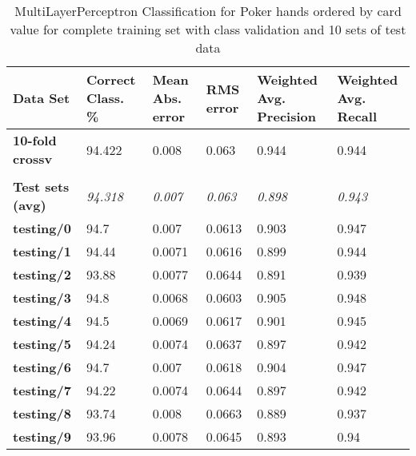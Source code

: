 \documentclass[10pt, a4paper]{article}
\begin{document}
\begin{table}[htbp]
  \centering
  \begin{tabular}{p{3cm}p{1.5cm}p{1.5cm}p{1.5cm}p{1.5cm}p{1.5cm}}
    \toprule
    \textbf{Data Set} & Correct Class. \% & Mean Abs. error & RMS error & Weighted Avg. Precision & Weighted Avg. Recall \\
    \midrule
    \textbf{10-fold crossv} & 94.422 & 0.008 & 0.063 & 0.944 & 0.944 \\
    \textbf{} &       &       &       &       &  \\
    \textbf{Test sets (avg)} & \textit{94.318} & \textit{0.007} & \textit{0.063} & \textit{0.898} & \textit{0.943} \\
    \textbf{   testing/0} & 94.7  & 0.007 & 0.0613 & 0.903 & 0.947 \\
    \textbf{   testing/1} & 94.44 & 0.0071 & 0.0616 & 0.899 & 0.944 \\
    \textbf{   testing/2} & 93.88 & 0.0077 & 0.0644 & 0.891 & 0.939 \\
    \textbf{   testing/3} & 94.8  & 0.0068 & 0.0603 & 0.905 & 0.948 \\
    \textbf{   testing/4} & 94.5  & 0.0069 & 0.0617 & 0.901 & 0.945 \\
    \textbf{   testing/5} & 94.24 & 0.0074 & 0.0637 & 0.897 & 0.942 \\
    \textbf{   testing/6} & 94.7  & 0.007 & 0.0618 & 0.904 & 0.947 \\
    \textbf{   testing/7} & 94.22 & 0.0074 & 0.0644 & 0.897 & 0.942 \\
    \textbf{   testing/8} & 93.74 & 0.008 & 0.0663 & 0.889 & 0.937 \\
    \textbf{   testing/9} & 93.96 & 0.0078 & 0.0645 & 0.893 & 0.94 \\
    \bottomrule
    \end{tabular}%


\caption{MultiLayerPerceptron Classification for Poker hands ordered by card value for complete training set with class validation and 10 sets of test data}   
  \label{tab:nnocresults}%
\end{table}%
\end{document}
